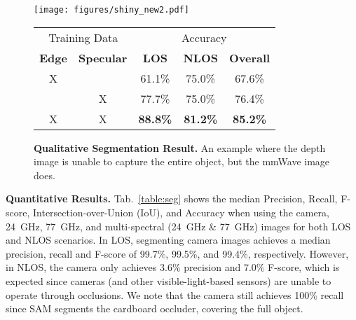 
\begin{figure*}
\begin{minipage}[t]{0.6\linewidth}
    \centering
    \texttt{[image: figures/shiny\_new2.pdf]}
\vspace{-0.25in}
    \caption{\footnotesize{\textbf{Qualitative Segmentation Result.}} \textnormal{An example where the depth image is unable to capture the entire object, but the mmWave image does.} }
\vspace{-0.2in}
    \label{fig:res_shiny}
    \end{minipage}
    \hfill
\begin{minipage}[t]{0.37\linewidth}
\footnotesize
\centering
\begin{tabular}[b]{ |c|c||c|c|c|}
\hline 
 \multicolumn{2}{|c||}{Training Data} & \multicolumn{3}{c|}{Accuracy}\\
   \Xhline{5\arrayrulewidth}  
  \textbf{Edge}  & \textbf{Specular}   & \textbf{LOS}  & \textbf{NLOS}  & \textbf{Overall}     \\  
 \Xhline{5\arrayrulewidth}  
  X & &  61.1\% & 75.0\% &   67.6\% \\ 
    \hline 
  & X & 77.7\% &  75.0\% &   76.4\% \\  
   \hline 
 X & X &  \textbf{88.8\%} &  \textbf{81.2\%} &   \textbf{85.2\%} \\ 
   \hline 
\end{tabular}
\vspace{-0.2in}
\label{table:classifier}
    \vspace{-0.2in}
\end{minipage}
\end{figure*} 



\noindent \textbf{Quantitative Results.}
Tab.~\ref{table:seg} shows the median Precision, Recall, F-score, Intersection-over-Union (IoU), and Accuracy when using the camera, 24~GHz, 77~GHz, and multi-spectral (24~GHz \& 77~GHz) images for both LOS and NLOS scenarios. In LOS, segmenting camera images achieves a median precision, recall and F-score of 99.7\%, 99.5\%, and 99.4\%, respectively. However, in NLOS, the camera only achieves 3.6\% precision and 7.0\% F-score, which is expected since cameras (and other visible-light-based sensors) are unable to operate through occlusions. We note that the camera still achieves 100\% recall since SAM segments the cardboard occluder, covering the full object.

